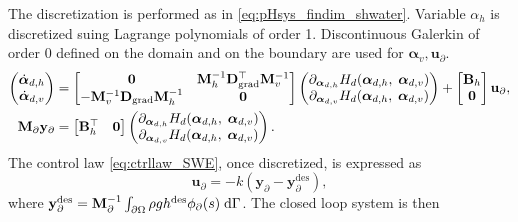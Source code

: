 The discretization is performed as in \eqref{eq:pHsys_findim_shwater}. Variable $\alpha_h$ is discretized suing Lagrange polynomials of order 1. Discontinuous Galerkin of order 0 defined on the domain and on the boundary are used for $\bm{\alpha}_v, \bm{u}_\partial$.
\begin{equation}\label{eq:pHsys_findim_shwater_ctrl}
\begin{aligned}
\begin{pmatrix}
\dot{\bm{\alpha}}_{d, h} \\
\dot{\bm{\alpha}}_{d, v} \\
\end{pmatrix}
&= \begin{bmatrix}
\mathbf{0} &  \mathbf{M}_h^{-1} \mathbf{D}_{\operatorname*{grad}}^\top \mathbf{M}_v^{-1} \\
-\mathbf{M}_v^{-1} \mathbf{D}_{\operatorname*{grad}} \mathbf{M}_h^{-1} & \mathbf{0} \\
\end{bmatrix} 
\begin{pmatrix}
\partial_{\bm{\alpha}_{d, h}} H_d(\bm{\alpha}_{d, h},\; \bm{\alpha}_{d, v})\\
\partial_{\bm{\alpha}_{d, v}} H_d(\bm{\alpha}_{d, h},\; \bm{\alpha}_{d, v})\\
\end{pmatrix} + 
\begin{bmatrix}
\mathbf{B}_h \\
\mathbf{0}\\
\end{bmatrix}
\mathbf{u}_\partial, \\
\mathbf{M}_\partial {\mathbf{y}_\partial} &= \begin{bmatrix}
\mathbf{B}_h^\top & \mathbf{0}
\end{bmatrix}\begin{pmatrix}
\partial_{\bm{\alpha}_{d, h}} H_d(\bm{\alpha}_{d, h},\; \bm{\alpha}_{d, v})\\
\partial_{\bm{\alpha}_{d, v}} H_d(\bm{\alpha}_{d, h},\; \bm{\alpha}_{d, v})\\
\end{pmatrix}.
\end{aligned}
\end{equation}
The control law \eqref{eq:ctrllaw_SWE}, once discretized, is expressed as
\begin{equation}
	\mathbf{u}_\partial = -k (\mathbf{y}_\partial - \mathbf{y}_\partial^{\text{des}}),
\end{equation}
where $\mathbf{y}_\partial^{\text{des}} = \mathbf{M}_\partial^{-1}\int_{\partial\Omega} \rho g h^{\text{des}} \phi_\partial(s) \d\Gamma$. The closed loop system is then
